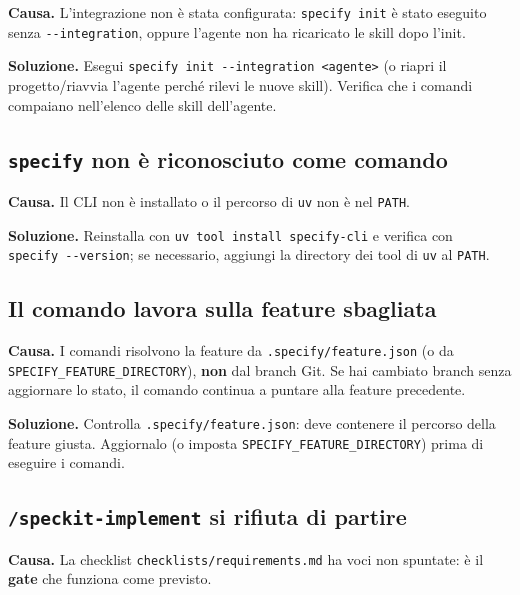 \documentclass[
  italian,
  10pt,
]{book}
\begin{document}
\textbf{Causa.} L'integrazione non è stata configurata:
\texttt{specify\ init} è stato eseguito senza \texttt{-\/-integration},
oppure l'agente non ha ricaricato le skill dopo l'init.

\textbf{Soluzione.} Esegui
\texttt{specify\ init\ -\/-integration\ \textless{}agente\textgreater{}}
(o riapri il progetto/riavvia l'agente perché rilevi le nuove skill).
Verifica che i comandi compaiano nell'elenco delle skill dell'agente.

\subsection{\texorpdfstring{\texttt{specify} non è riconosciuto come
comando}{specify non è riconosciuto come comando}}\label{specify-non-uxe8-riconosciuto-come-comando}

\textbf{Causa.} Il CLI non è installato o il percorso di \texttt{uv} non
è nel \texttt{PATH}.

\textbf{Soluzione.} Reinstalla con
\texttt{uv\ tool\ install\ specify-cli} e verifica con
\texttt{specify\ -\/-version}; se necessario, aggiungi la directory dei
tool di \texttt{uv} al \texttt{PATH}.

\subsection{Il comando lavora sulla feature
sbagliata}\label{il-comando-lavora-sulla-feature-sbagliata}

\textbf{Causa.} I comandi risolvono la feature da
\texttt{.specify/feature.json} (o da
\texttt{SPECIFY\_FEATURE\_DIRECTORY}), \textbf{non} dal branch Git. Se
hai cambiato branch senza aggiornare lo stato, il comando continua a
puntare alla feature precedente.

\textbf{Soluzione.} Controlla \texttt{.specify/feature.json}: deve
contenere il percorso della feature giusta. Aggiornalo (o imposta
\texttt{SPECIFY\_FEATURE\_DIRECTORY}) prima di eseguire i comandi.

\subsection{\texorpdfstring{\texttt{/speckit-implement} si rifiuta di
partire}{/speckit-implement si rifiuta di partire}}\label{speckit-implement-si-rifiuta-di-partire}

\textbf{Causa.} La checklist \texttt{checklists/requirements.md} ha voci
non spuntate: è il \textbf{gate} che funziona come previsto.
\end{document}
